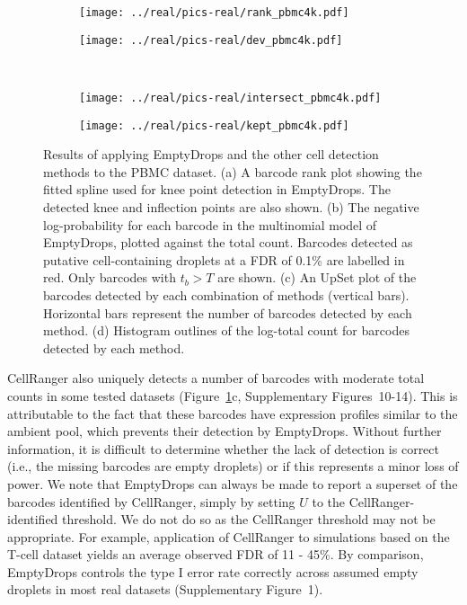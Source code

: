 \documentclass[10pt,letterpaper]{article}
\newcommand{\suppfignegative}{1}
\newcommand{\suppfigrealresults}{10-14}
\begin{document}
\begin{figure}[btp]
    \begin{center}
    \begin{subfigure}{0.49\textwidth}
        \texttt{[image: ../real/pics-real/rank\_pbmc4k.pdf]}
        \caption{}
    \end{subfigure}
    \begin{subfigure}{0.49\textwidth}
        \texttt{[image: ../real/pics-real/dev\_pbmc4k.pdf]}
        \caption{}
    \end{subfigure}\\[0.1in]
    \begin{subfigure}[b]{0.49\textwidth}
        \texttt{[image: ../real/pics-real/intersect\_pbmc4k.pdf]}
        \caption{}
    \end{subfigure}
    \begin{subfigure}[b]{0.49\textwidth}
        \texttt{[image: ../real/pics-real/kept\_pbmc4k.pdf]}
        \caption{}
    \end{subfigure}
\end{center}
    \caption{Results of applying EmptyDrops and the other cell detection methods to the PBMC dataset.
        (a) A barcode rank plot showing the fitted spline used for knee point detection in EmptyDrops. 
        The detected knee and inflection points are also shown.
        (b) The negative log-probability for each barcode in the multinomial model of EmptyDrops, plotted against the total count.
        Barcodes detected as putative cell-containing droplets at a FDR of 0.1\% are labelled in red.
        Only barcodes with $t_b > T$ are shown.
        (c) An UpSet plot \cite{lex2014upset} of the barcodes detected by each combination of methods (vertical bars).
        Horizontal bars represent the number of barcodes detected by each method.
        (d) Histogram outlines of the log-total count for barcodes detected by each method.
    }
\label{fig:realpbmc}
\end{figure}

CellRanger also uniquely detects a number of barcodes with moderate total counts in some tested datasets (Figure~\ref{fig:realpbmc}c, Supplementary Figures~\suppfigrealresults{}).
This is attributable to the fact that these barcodes have expression profiles similar to the ambient pool, which prevents their detection by EmptyDrops.
Without further information, it is difficult to determine whether the lack of detection is correct (i.e., the missing barcodes are empty droplets) or if this represents a minor loss of power.
We note that EmptyDrops can always be made to report a superset of the barcodes identified by CellRanger, simply by setting $U$ to the CellRanger-identified threshold.
We do not do so as the CellRanger threshold may not be appropriate.
For example, application of CellRanger to simulations based on the T-cell dataset yields an average observed FDR of 11 - 45\%.
By comparison, EmptyDrops controls the type I error rate correctly across assumed empty droplets in most real datasets (Supplementary Figure~\suppfignegative{}).
\end{document}
